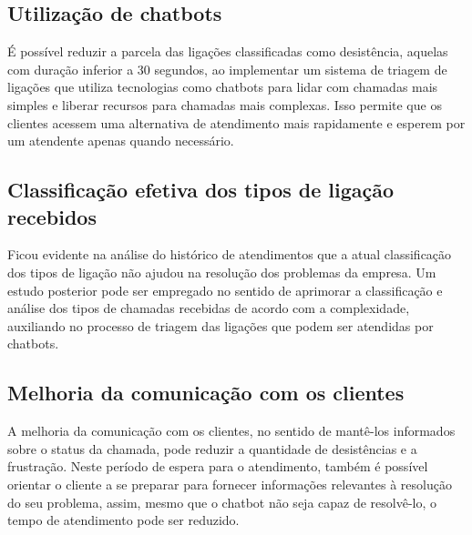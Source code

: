 \subsection{Utilização de chatbots}
É possível reduzir a parcela das ligações classificadas como desistência, aquelas com duração inferior a 30 segundos, ao implementar um sistema de triagem de ligações que utiliza tecnologias como chatbots para lidar com chamadas mais simples e liberar recursos para chamadas mais complexas. Isso permite que os clientes acessem uma alternativa de atendimento mais rapidamente e esperem por um atendente apenas quando necessário.

\subsection{Classificação efetiva dos tipos de ligação recebidos}
Ficou evidente na análise do histórico de atendimentos que a atual classificação dos tipos de ligação não ajudou na resolução dos problemas da empresa. Um estudo posterior pode ser empregado no sentido de aprimorar a classificação e análise dos tipos de chamadas recebidas de acordo com a complexidade, auxiliando no processo de triagem das ligações que podem ser atendidas por chatbots.

\subsection{Melhoria da comunicação com os clientes}
A melhoria da comunicação com os clientes, no sentido de mantê-los informados sobre o status da chamada, pode reduzir a quantidade de desistências e a frustração. Neste período de espera para o atendimento, também é possível orientar o cliente a se preparar para fornecer informações relevantes à resolução do seu problema, assim, mesmo que o chatbot não seja capaz de resolvê-lo, o tempo de atendimento pode ser reduzido.